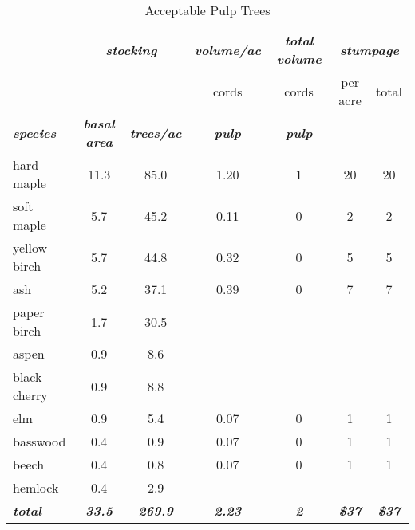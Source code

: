 \documentclass[landscape]{article}
\begin{document}
\begin{table}[H]

\caption{\label{tab:unnamed-chunk-49}Acceptable Pulp Trees}
\fontsize{10}{12}\selectfont
\begin{tabular}[t]{lcccccc}
\toprule
\multicolumn{1}{c}{\em{\textbf{ }}} & \multicolumn{2}{c}{\em{\textbf{stocking}}} & \multicolumn{1}{c}{\em{\textbf{volume/ac }}} & \multicolumn{1}{c}{\em{\textbf{total volume}}} & \multicolumn{2}{c}{\em{\textbf{stumpage}}} \\
\cmidrule(l{3pt}r{3pt}){2-3} \cmidrule(l{3pt}r{3pt}){4-4} \cmidrule(l{3pt}r{3pt}){5-5} \cmidrule(l{3pt}r{3pt}){6-7}
\multicolumn{3}{c}{ } & \multicolumn{1}{c}{cords} & \multicolumn{1}{c}{cords} & \multicolumn{1}{c}{per acre} & \multicolumn{1}{c}{total} \\
\cmidrule(l{3pt}r{3pt}){4-4} \cmidrule(l{3pt}r{3pt}){5-5} \cmidrule(l{3pt}r{3pt}){6-6} \cmidrule(l{3pt}r{3pt}){7-7}
\rowcolor[HTML]{DCDCDC}  \em{\textbf{species}} & \em{\textbf{basal area}} & \em{\textbf{trees/ac}} & \em{\textbf{pulp}} & \em{\textbf{pulp}} & \em{\textbf{ }} & \em{\textbf{ }}\\
\midrule
\rowcolor{gray!6}  hard maple & 11.3 & 85.0 & 1.20 & 1 & 20 & 20\\
 
soft maple & 5.7 & 45.2 & 0.11 & 0 & 2 & 2\\
 
\rowcolor{gray!6}  yellow birch & 5.7 & 44.8 & 0.32 & 0 & 5 & 5\\
 
ash & 5.2 & 37.1 & 0.39 & 0 & 7 & 7\\
 
\rowcolor{gray!6}  paper birch & 1.7 & 30.5 &  &  &  & \\
 
aspen & 0.9 & 8.6 &  &  &  & \\
 
\rowcolor{gray!6}  black cherry & 0.9 & 8.8 &  &  &  & \\
 
elm & 0.9 & 5.4 & 0.07 & 0 & 1 & 1\\
 
\rowcolor{gray!6}  basswood & 0.4 & 0.9 & 0.07 & 0 & 1 & 1\\
 
beech & 0.4 & 0.8 & 0.07 & 0 & 1 & 1\\
 
\rowcolor{gray!6}  hemlock & 0.4 & 2.9 &  &  &  & \\
 
\rowcolor[HTML]{DCDCDC}  \em{\textbf{total}} & \em{\textbf{33.5}} & \em{\textbf{269.9}} & \em{\textbf{2.23}} & \em{\textbf{2}} & \em{\textbf{\$37}} & \em{\textbf{\$37}}\\
\bottomrule
\end{tabular}
\end{table}
\end{document}
